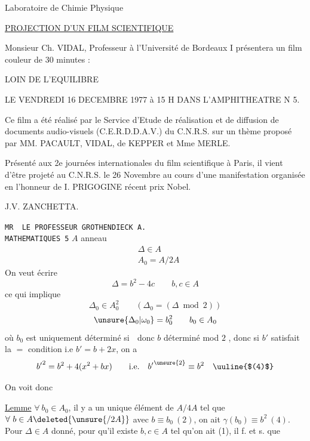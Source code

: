 Laboratoire de Chimie Physique

\begin{center}\uline{PROJECTION D'UN FILM SCIENTIFIQUE}\end{center}

Monsieur Ch. VIDAL, Professeur à l'Université de Bordeaux I présentera un film couleur de 30 minutes :

\begin{center}\textquotedbl{}LOIN DE L'EQUILIBRE\textquotedbl{}\end{center}

LE VENDREDI 16 DECEMBRE 1977 à 15 H DANS L'AMPHITHEATRE N\textdegree{} 5.

Ce film a été réalisé par le Service d'Etude de réalisation et de diffusion de documents audio-visuels (C.E.R.D.D.A.V.) du C.N.R.S. sur un thème proposé par MM. PACAULT, VIDAL, de KEPPER et Mme MERLE.

Présenté aux 2e journées internationales du film scientifique à Paris, il vient d'être projeté au C.N.R.S. le 26 Novembre au cours d'une manifestation organisée en l'honneur de I. PRIGOGINE récent prix Nobel.

\hfill J.V. ZANCHETTA.

\texttt{MR \ LE PROFESSEUR GROTHENDIECK A.}\\
\texttt{MATHEMATIQUES \hspace{7em} 5}
$A$ anneau
\[
\begin{aligned}
&\Delta\in A\\
&A_0=A/2A
\end{aligned}
\]
On veut écrire
\[
\Delta=b^2-4c\qquad b,c\in A \tag*{(1)}
\]
ce qui implique
\[
\Delta_0\in A_0^2\qquad(\Delta_0=(\Delta\bmod2))
\]
\[
\unsure{\Delta_0|\omega_0}=b_0^2\qquad b_0\in A_0
\]
où $b_0$ est uniquement déterminé si \textcircled{\scriptsize{}} donc  $b$ déterminé mod $2$ , donc si $b'$ satisfait la $=$ condition i.e $b'=b+2x$, on a
\[
{b'}^2=b^2+4(x^2+bx)\qquad\text{i.e.}\quad {b'}^{\unsure{2}}\equiv b^2\quad\text{\uuline{$(4)$}}
\]

On voit donc

\uline{Lemme} \quad $\forall\ b_0\in A_0$, il y a un unique élément  de $A/4A$ tel que $\forall\ b\in A\deleted{\unsure{/2A}}$ avec $b\equiv b_0\ (2)$, on ait $\gamma(b_0)\equiv b^2\ (4)$. Pour $\Delta\in A$ donné, pour qu'il existe $b,c\in A$ tel qu'on ait (1), il f. et s. que

